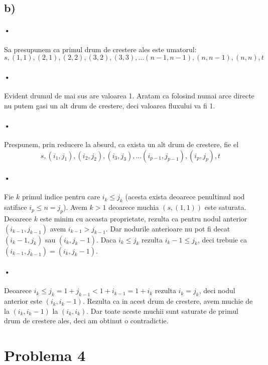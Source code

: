\documentclass[paper=a4, fontsize=11pt]{scrartcl}
\begin{document}
\subsection*{b)}
\paragraph{•}
Sa presupunem ca primul drum de crestere ales este umatorul:
\[ s, (1,1), (2,1), (2,2), (3,2), (3,3), ... (n-1,n-1), (n,n-1), (n,n), t \]

\paragraph{•}
Evident drumul de mai sus are valoarea 1. Aratam ca folosind numai arce directe nu putem gasi un alt drum de crestere, deci valoarea fluxului va fi 1.

\paragraph{•}
Prespunem, prin reducere la absurd, ca exista un alt drum de crestere, fie el
\[ s, (i_1,j_1), (i_2,j_2), (i_3,j_3), ... (i_{p-1},j_{p-1}), (i_p,j_p), t \]

\paragraph{•}
Fie $k$ primul indice pentru care $i_k \leq j_k$ (acesta exista deoarece penultimul nod satiface $i_p\leq n=j_p$). Avem $k>1$ deoarece muchia $(s,(1,1))$ este saturata. Deoarece $k$ este minim cu aceasta proprietate, rezulta ca pentru nodul anterior $(i_{k-1},j_{k-1})$ avem $i_{k-1} > j_{k-1}$. Dar nodurile anterioare nu pot fi decat $(i_k-1,j_k)$ sau $(i_k,j_k-1)$. Daca $i_k \leq j_k$ rezulta $i_k-1 \leq j_k$, deci trebuie ca $(i_{k-1},j_{k-1})=(i_k,j_k-1)$.

\paragraph{•}
Deoarece $i_k \leq j_k = 1 + j_{k-1} < 1 + i_{k-1} = 1 + i_k$ rezulta $i_k = j_k$, deci nodul anterior este $(i_k,i_k-1)$. Rezulta ca in acest drum de crestere, avem muchie de la $(i_k,i_k-1)$ la $(i_k,i_k)$. Dar toate aceste muchii sunt saturate de primul drum de crestere ales, deci am obtinut o contradictie.

\newpage
\section*{Problema 4}
\end{document}

